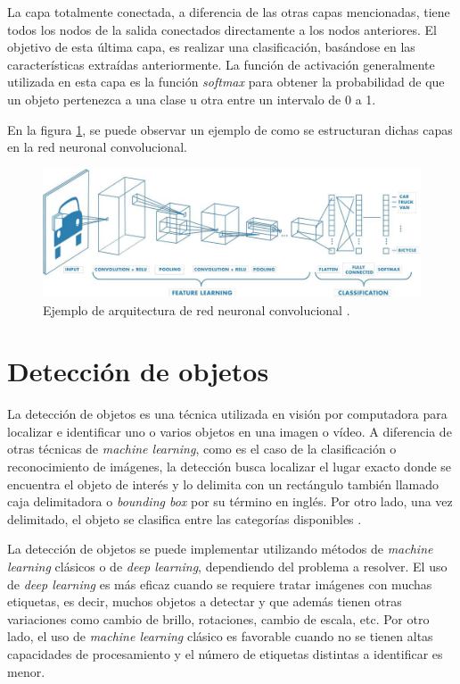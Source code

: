 La capa totalmente conectada, a diferencia de las otras capas mencionadas, tiene todos los nodos de la salida conectados directamente a los nodos anteriores. El objetivo de esta última capa, es realizar una clasificación, basándose en las características extraídas anteriormente. La función de activación generalmente utilizada en esta capa es la función \textit{softmax} para obtener la probabilidad de que un objeto pertenezca a una clase u otra entre un intervalo de 0 a 1.

En la figura \ref{fig:cnn}, se puede observar un ejemplo de como se estructuran dichas capas en la red neuronal convolucional.


\begin{figure}[ht]
	\centering
	\includegraphics[scale=.45]{./Figures/cnn-image.jpeg}
	\caption{Ejemplo de arquitectura de red neuronal convolucional \cite{WEBSITE:2}.}
	\label{fig:cnn}
\end{figure}


\section{Detección de objetos}

La detección de objetos es una técnica utilizada en visión por computadora para localizar e identificar uno o varios objetos en una imagen o vídeo. A diferencia de otras técnicas de \textit{machine learning}, como es el caso de la clasificación o reconocimiento de imágenes, la detección busca localizar el lugar exacto donde se encuentra el objeto de interés y lo delimita con un rectángulo también llamado caja delimitadora o \textit{bounding box} por su término en inglés. Por otro lado, una vez delimitado, el objeto se clasifica entre las categorías disponibles \cite{WEBSITE:5}.

La detección de objetos se puede implementar utilizando métodos de \textit{machine learning} clásicos o de \textit{deep learning}, dependiendo del problema a resolver\cite{WEBSITE:6}. El uso de \textit{deep learning} es más eficaz cuando se requiere tratar imágenes con muchas etiquetas, es decir, muchos objetos a detectar y que además tienen otras variaciones como cambio de brillo, rotaciones, cambio de escala, etc. Por otro lado, el uso de \textit{machine learning} clásico es favorable cuando no se tienen altas capacidades de procesamiento y el número de etiquetas distintas a identificar es menor.

